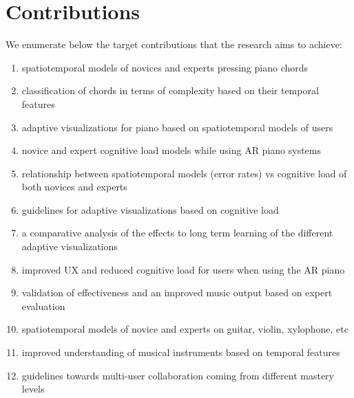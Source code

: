 \documentclass[manuscript,screen]{acmart}
\begin{document}
\section{Contributions}
\label{sec:contri}
We enumerate below the target contributions that the research aims to achieve: 
\begin{enumerate}
    \item spatiotemporal models of novices and experts pressing piano chords
    \item classification of chords in terms of complexity based on their temporal features
    \item adaptive visualizations for piano based on spatiotemporal models of users
    \item novice and expert cognitive load models while using AR piano systems
    \item relationship between spatiotemporal models (error rates) vs cognitive load of both novices and experts
    \item guidelines for adaptive visualizations based on cognitive load
    \item a comparative analysis of the effects to long term learning of the different adaptive visualizations
    \item improved UX and reduced cognitive load for users when using the AR piano
    \item validation of effectiveness and an improved music output based on expert evaluation
    \item spatiotemporal models of novice and experts on guitar, violin, xylophone, etc
    \item improved understanding of musical instruments based on temporal features
    \item guidelines towards multi-user collaboration coming from different mastery levels
\end{enumerate}
\end{document}
